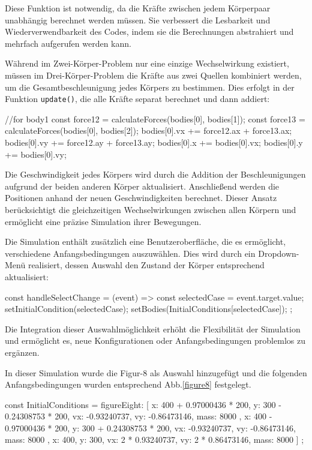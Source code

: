 \documentclass[a4paper,12pt,twoside]{article}
\begin{document}
Diese Funktion ist notwendig, da die Kräfte zwischen jedem Körperpaar unabhängig berechnet werden müssen. Sie verbessert die Lesbarkeit und Wiederverwendbarkeit des Codes, indem sie die Berechnungen abstrahiert und mehrfach aufgerufen werden kann.

Während im Zwei-Körper-Problem nur eine einzige Wechselwirkung existiert, müssen im Drei-Körper-Problem die Kräfte aus zwei Quellen kombiniert werden, um die Gesamtbeschleunigung jedes Körpers zu bestimmen. Dies erfolgt in der Funktion \texttt{update()}, die alle Kräfte separat berechnet und dann addiert:

\begin{javascript}
//for body1
const force12 = calculateForces(bodies[0], bodies[1]);
const force13 = calculateForces(bodies[0], bodies[2]);
bodies[0].vx += force12.ax + force13.ax;
bodies[0].vy += force12.ay + force13.ay;
bodies[0].x += bodies[0].vx;
bodies[0].y += bodies[0].vy;
\end{javascript}

Die Geschwindigkeit jedes Körpers wird durch die Addition der Beschleunigungen aufgrund der beiden anderen Körper aktualisiert. Anschließend werden die Positionen anhand der neuen Geschwindigkeiten berechnet. Dieser Ansatz berücksichtigt die gleichzeitigen Wechselwirkungen zwischen allen Körpern und ermöglicht eine präzise Simulation ihrer Bewegungen.

Die Simulation enthält zusätzlich eine Benutzeroberfläche, die es ermöglicht, verschiedene Anfangsbedingungen auszuwählen. Dies wird durch ein Dropdown-Menü realisiert, dessen Auswahl den Zustand der Körper entsprechend aktualisiert:

\begin{javascript}
    const handleSelectChange = (event) => {
    const selectedCase = event.target.value;
    setInitialCondition(selectedCase);
    setBodies(InitialConditions[selectedCase]);
};
\end{javascript}

Die Integration dieser Auswahlmöglichkeit erhöht die Flexibilität der Simulation und ermöglicht es, neue Konfigurationen oder Anfangsbedingungen problemlos zu ergänzen.

In dieser Simulation wurde die Figur-8 als Auswahl hinzugefügt und die folgenden Anfangsbedingungen wurden entsprechend Abb.\ref{figure8} festgelegt. 

\begin{javascript}
    const InitialConditions = {
        figureEight: [
            { x: 400 + 0.97000436 * 200, y: 300 - 0.24308753 * 200, vx: -0.93240737, vy: -0.86473146, mass: 8000 },
            { x: 400 - 0.97000436 * 200, y: 300 + 0.24308753 * 200, vx: -0.93240737, vy: -0.86473146, mass: 8000 },
            { x: 400, y: 300, vx: 2 * 0.93240737, vy: 2 * 0.86473146, mass: 8000}
        ]
    };
\end{javascript}
\end{document}
